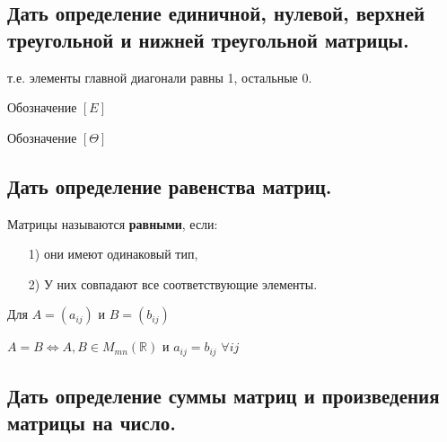 \subsection{Дать определение единичной, нулевой, верхней треугольной и нижней треугольной матрицы.}


т.е. элементы главной диагонали равны 1, остальные 0.

Обозначение $[E]$

\vspace*{15pt}


Обозначение $[\Theta]$

\vspace*{15pt}


\vspace*{15pt}


\subsection{Дать определение равенства матриц.}

Матрицы называются {\bf{равными}}, если:
\begin{enumerate}
    \item[1)] они имеют одинаковый тип,
    \item[2)] У них совпадают все соответствующие элементы.
\end{enumerate}

 \begin{center} 
    Для $A = (a_{ij})$ и $B = (b_{ij})$
 
    $A = B \iff A, B \in M_{mn}(\mathbb{R})$ и $a_{ij} = b_{ij}$ $\forall ij$  
\end{center}



\subsection{Дать определение суммы матриц и произведения матрицы на число.}

